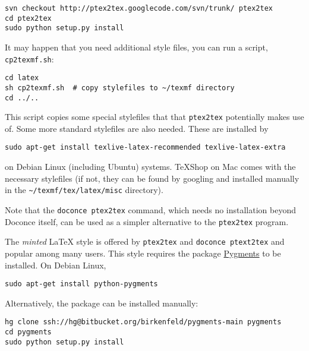 \documentclass[%
oneside,                 %
final,                   %
10pt]{article}
\begin{document}
\vspace{4pt}
\begin{Verbatim}[numbers=none,frame=lines,label=\fbox{{\tiny Terminal}},fontsize=\fontsize{9pt}{9pt},
labelposition=topline,framesep=2.5mm,framerule=0.7pt]
svn checkout http://ptex2tex.googlecode.com/svn/trunk/ ptex2tex
cd ptex2tex
sudo python setup.py install
\end{Verbatim}
It may happen that you need additional style files, you can run
a script, {\fontsize{10pt}{10pt}\Verb!cp2texmf.sh!}:

\vspace{4pt}
\begin{Verbatim}[numbers=none,frame=lines,label=\fbox{{\tiny Terminal}},fontsize=\fontsize{9pt}{9pt},
labelposition=topline,framesep=2.5mm,framerule=0.7pt]
cd latex
sh cp2texmf.sh  # copy stylefiles to ~/texmf directory
cd ../..
\end{Verbatim}
This script copies some special stylefiles that
that {\fontsize{10pt}{10pt}\Verb!ptex2tex!} potentially makes use of. Some more standard stylefiles
are also needed. These are installed by

\vspace{4pt}
\begin{Verbatim}[numbers=none,frame=lines,label=\fbox{{\tiny Terminal}},fontsize=\fontsize{9pt}{9pt},
labelposition=topline,framesep=2.5mm,framerule=0.7pt]
sudo apt-get install texlive-latex-recommended texlive-latex-extra
\end{Verbatim}
on Debian Linux (including Ubuntu) systems. TeXShop on Mac comes with
the necessary stylefiles (if not, they can be found by googling and installed
manually in the {\fontsize{10pt}{10pt}\Verb!~/texmf/tex/latex/misc!} directory).

Note that the {\fontsize{10pt}{10pt}\Verb!doconce ptex2tex!} command, which needs no installation
beyond Doconce itself, can be used as a simpler alternative to the {\fontsize{10pt}{10pt}\Verb!ptex2tex!}
program.

The \emph{minted} {\LaTeX} style is offered by {\fontsize{10pt}{10pt}\Verb!ptex2tex!} and {\fontsize{10pt}{10pt}\Verb!doconce ptext2tex!}
and popular among many
users. This style requires the package \href{{http://pygments.org}}{Pygments}
to be installed. On Debian Linux,
\vspace{4pt}
\begin{Verbatim}[numbers=none,frame=lines,label=\fbox{{\tiny Terminal}},fontsize=\fontsize{9pt}{9pt},
labelposition=topline,framesep=2.5mm,framerule=0.7pt]
sudo apt-get install python-pygments
\end{Verbatim}
Alternatively, the package can be installed manually:
\vspace{4pt}
\begin{Verbatim}[numbers=none,frame=lines,label=\fbox{{\tiny Terminal}},fontsize=\fontsize{9pt}{9pt},
labelposition=topline,framesep=2.5mm,framerule=0.7pt]
hg clone ssh://hg@bitbucket.org/birkenfeld/pygments-main pygments
cd pygments
sudo python setup.py install
\end{Verbatim}
\end{document}
